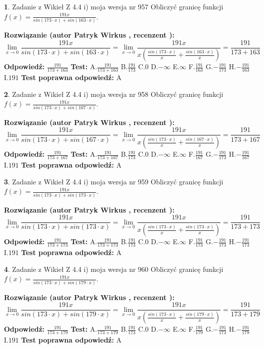 \documentclass[12pt, a4paper]{article}
\theoremstyle{definition} %
\newtheorem{zad}{}
\newcommand{\zadStart}[1]{\begin{zad}#1\newline}
\newcommand{\zadStop}{\end{zad}}
\newcommand{\rozwStart}[2]{\noindent \textbf{Rozwiązanie (autor #1 , recenzent #2): }\newline}
\newcommand{\rozwStop}{\newline}
\newcommand{\odpStart}{\noindent \textbf{Odpowiedź:}\newline}
\newcommand{\odpStop}{\newline}
\newcommand{\testStart}{\noindent \textbf{Test:}\newline}
\newcommand{\testStop}{\newline}
\newcommand{\kluczStart}{\noindent \textbf{Test poprawna odpowiedź:}\newline}
\newcommand{\kluczStop}{\newline}
\begin{document}
\zadStart{Zadanie z Wikieł Z 4.4 i) moja wersja nr 957}
Obliczyć granicę funkcji $f(x)=\frac{191x}{sin(173\cdot x) +sin(163\cdot x)}$.
\zadStop
\rozwStart{Patryk Wirkus}{}
$$\lim\limits_{x\to 0}\frac{191x}{sin(173\cdot x) +sin(163\cdot x)}=\lim\limits_{x\to 0}\frac{191x}{x(\frac{sin(173\cdot x)}{x}+\frac{sin(163\cdot x)}{x})}=\frac{191}{173+163}$$
\rozwStop
\odpStart
$\frac{191}{173+163}$
\odpStop
\testStart
A.$\frac{191}{173+163}$
B.$\frac{191}{173}$
C.$0$
D.$-\infty$
E.$\infty$
F.$\frac{191}{163}$
G.$-\frac{191}{173}$
H.$-\frac{191}{163}$
I.$191$
\testStop
\kluczStart
A
\kluczStop



\zadStart{Zadanie z Wikieł Z 4.4 i) moja wersja nr 958}
Obliczyć granicę funkcji $f(x)=\frac{191x}{sin(173\cdot x) +sin(167\cdot x)}$.
\zadStop
\rozwStart{Patryk Wirkus}{}
$$\lim\limits_{x\to 0}\frac{191x}{sin(173\cdot x) +sin(167\cdot x)}=\lim\limits_{x\to 0}\frac{191x}{x(\frac{sin(173\cdot x)}{x}+\frac{sin(167\cdot x)}{x})}=\frac{191}{173+167}$$
\rozwStop
\odpStart
$\frac{191}{173+167}$
\odpStop
\testStart
A.$\frac{191}{173+167}$
B.$\frac{191}{173}$
C.$0$
D.$-\infty$
E.$\infty$
F.$\frac{191}{167}$
G.$-\frac{191}{173}$
H.$-\frac{191}{167}$
I.$191$
\testStop
\kluczStart
A
\kluczStop



\zadStart{Zadanie z Wikieł Z 4.4 i) moja wersja nr 959}
Obliczyć granicę funkcji $f(x)=\frac{191x}{sin(173\cdot x) +sin(173\cdot x)}$.
\zadStop
\rozwStart{Patryk Wirkus}{}
$$\lim\limits_{x\to 0}\frac{191x}{sin(173\cdot x) +sin(173\cdot x)}=\lim\limits_{x\to 0}\frac{191x}{x(\frac{sin(173\cdot x)}{x}+\frac{sin(173\cdot x)}{x})}=\frac{191}{173+173}$$
\rozwStop
\odpStart
$\frac{191}{173+173}$
\odpStop
\testStart
A.$\frac{191}{173+173}$
B.$\frac{191}{173}$
C.$0$
D.$-\infty$
E.$\infty$
F.$\frac{191}{173}$
G.$-\frac{191}{173}$
H.$-\frac{191}{173}$
I.$191$
\testStop
\kluczStart
A
\kluczStop



\zadStart{Zadanie z Wikieł Z 4.4 i) moja wersja nr 960}
Obliczyć granicę funkcji $f(x)=\frac{191x}{sin(173\cdot x) +sin(179\cdot x)}$.
\zadStop
\rozwStart{Patryk Wirkus}{}
$$\lim\limits_{x\to 0}\frac{191x}{sin(173\cdot x) +sin(179\cdot x)}=\lim\limits_{x\to 0}\frac{191x}{x(\frac{sin(173\cdot x)}{x}+\frac{sin(179\cdot x)}{x})}=\frac{191}{173+179}$$
\rozwStop
\odpStart
$\frac{191}{173+179}$
\odpStop
\testStart
A.$\frac{191}{173+179}$
B.$\frac{191}{173}$
C.$0$
D.$-\infty$
E.$\infty$
F.$\frac{191}{179}$
G.$-\frac{191}{173}$
H.$-\frac{191}{179}$
I.$191$
\testStop
\kluczStart
A
\kluczStop
\end{document}
